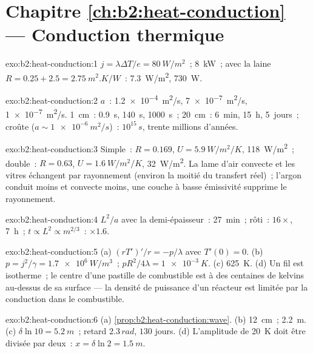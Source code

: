 \section*{Chapitre \ref{ch:b2:heat-conduction} --- Conduction thermique}

\begin{solution}{exo:b2:heat-conduction:1}
$j = \lambda\Delta T/e = \qty{80}{W/m^2}$~; \qty{8}{kW}~; avec la laine $R = 0.25 + 2.5 =
\qty{2.75}{m^2.K/W}$~: \qty{7.3}{W/m^2}, \qty{730}{W}.
\end{solution}

\begin{solution}{exo:b2:heat-conduction:2}
$a$~: \qty{1.2e-4}{m^2/s}, \qty{7e-7}{m^2/s}, \qty{1e-7}{m^2/s}. \qty{1}{cm}~:
\qty{0.9}{s}, \qty{140}{s}, \qty{1000}{s}~; \qty{20}{cm}~: \qty{6}{min}, \qty{15}{h},
\qty{5}{jours}~; croûte ($a \sim \qty{1e-6}{m^2/s}$)~: $10^{15}\,\unit{s}$, trente
millions d'années.
\end{solution}

\begin{solution}{exo:b2:heat-conduction:3}
Simple~: $R = 0.169$, $U = \qty{5.9}{W/m^2/K}$, \qty{118}{W/m^2}~; double~: $R =
0.63$, $U = \qty{1.6}{W/m^2/K}$, \qty{32}{W/m^2}. La lame d'air convecte et les vitres
échangent par rayonnement (environ la moitié du transfert réel)~; l'argon conduit
moins et convecte moins, une couche à basse émissivité supprime le
rayonnement.
\end{solution}

\begin{solution}{exo:b2:heat-conduction:4}
$L^2/a$ avec la demi-épaisseur~: \qty{27}{min}~; rôti~: $16\times$, \qty{7}{h}~;
$t \propto L^2 \propto m^{2/3}$~: $\times 1.6$.
\end{solution}

\begin{solution}{exo:b2:heat-conduction:5}
(a) $(rT')'/r = -p/\lambda$ avec $T'(0) = 0$. (b) $p = j^2/\gamma = \qty{1.7e6}{W/m^3}$~;
$pR^2/4\lambda = \qty{1e-3}{K}$. (c) \qty{625}{K}. (d) Un fil est isotherme~; le centre
d'une pastille de combustible est à des centaines de kelvins au-dessus de sa surface --- la densité
de puissance d'un réacteur est limitée par la conduction dans le combustible.
\end{solution}

\begin{solution}{exo:b2:heat-conduction:6}
(a) \cref{prop:b2:heat-conduction:wave}. (b) \qty{12}{cm}~; \qty{2.2}{m}. (c)
$\delta\ln 10 = \qty{5.2}{m}$~; retard $2.3\,\unit{rad}$, $130$ jours. (d)
L'amplitude de \qty{20}{K} doit être divisée par deux~: $x = \delta\ln 2 = \qty{1.5}{m}$.
\end{solution}

